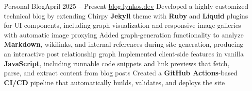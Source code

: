 
\subheading
    {Personal Blog}{April 2025 -- Present}
    {\href{https://blog.lynkos.dev}{blog.lynkos.dev}}{}
    \itemListStart
    \listItem{}
        {Developed a highly customized technical blog by extending Chirpy \textbf{Jekyll} theme with \textbf{Ruby} and \textbf{Liquid} plugins for UI components, including graph visualization and responsive image galleries with automatic image proxying}
    \listItem{}
        {Added graph-generation functionality to analyze \textbf{Markdown}, wikilinks, and internal references during site generation, producing an interactive post relationship graph}
    \listItem{}
        {Implemented client-side features in vanilla \textbf{JavaScript}, including runnable code snippets and link previews that fetch, parse, and extract content from blog posts}
    \listItem{}
        {Created a \textbf{GitHub Actions}-based \textbf{CI/CD} pipeline that automatically builds, validates, and deploys the site}
    \itemListEnd



